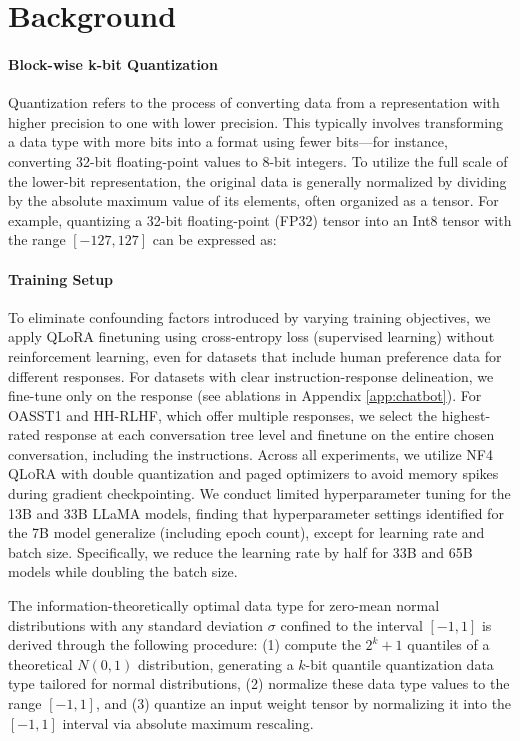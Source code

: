 \section{Background}
\paragraph{Block-wise k-bit Quantization} Quantization refers to the process of converting data from a representation with higher precision to one with lower precision. This typically involves transforming a data type with more bits into a format using fewer bits—for instance, converting 32-bit floating-point values to 8-bit integers. To utilize the full scale of the lower-bit representation, the original data is generally normalized by dividing by the absolute maximum value of its elements, often organized as a tensor. For example, quantizing a 32-bit floating-point (FP32) tensor into an Int8 tensor with the range $[-127, 127]$ can be expressed as:

\paragraph{Training Setup} To eliminate confounding factors introduced by varying training objectives, we apply QLoRA finetuning using cross-entropy loss (supervised learning) without reinforcement learning, even for datasets that include human preference data for different responses. For datasets with clear instruction-response delineation, we fine-tune only on the response (see ablations in Appendix \ref{app:chatbot}). For OASST1 and HH-RLHF, which offer multiple responses, we select the highest-rated response at each conversation tree level and finetune on the entire chosen conversation, including the instructions. Across all experiments, we utilize NF4 \textsc{QLoRA} with double quantization and paged optimizers to avoid memory spikes during gradient checkpointing. We conduct limited hyperparameter tuning for the 13B and 33B LLaMA models, finding that hyperparameter settings identified for the 7B model generalize (including epoch count), except for learning rate and batch size. Specifically, we reduce the learning rate by half for 33B and 65B models while doubling the batch size.

The information-theoretically optimal data type for zero-mean normal distributions with any standard deviation $\sigma$ confined to the interval $[-1, 1]$ is derived through the following procedure: (1) compute the $2^k+1$ quantiles of a theoretical $N(0, 1)$ distribution, generating a $k$-bit quantile quantization data type tailored for normal distributions, (2) normalize these data type values to the range $[-1, 1]$, and (3) quantize an input weight tensor by normalizing it into the $[-1, 1]$ interval via absolute maximum rescaling.

